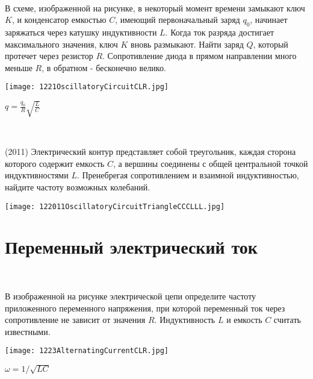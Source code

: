 \begin{ex}
\hspace{0pt} \\
\begin{minipage}{.65\textwidth}
В схеме, изображенной на рисунке, в некоторый момент времени замыкают ключ $K$, и конденсатор емкостью $C$, имеющий первоначальный заряд $q_0$, начинает заряжаться через катушку индуктивности $L$. 
Когда ток разряда достигает максимального значения, ключ $K$ вновь размыкают. Найти заряд $Q$, который протечет через резистор $R$. 
Сопротивление диода в прямом направлении много меньше $R$, в обратном - бесконечно велико.
\end{minipage}
\begin{minipage}{.35\textwidth}
\centering
\texttt{[image: 1221OscillatoryCircuitCLR.jpg]}
\end{minipage}
\begin{ans}
$q=\frac{q_0}{R}\sqrt{\frac{L}{C}}$
\end{ans}
\end{ex}

\begin{ex}
\hspace{0pt} \\
\begin{minipage}{.65\textwidth}
(2011) Электрический контур представляет собой треугольник, каждая сторона которого содержит емкость $C$, а вершины соединены с общей центральной точкой индуктивностями $L$. 
Пренебрегая сопротивлением и взаимной индуктивностью, найдите частоту возможных колебаний.
\end{minipage}
\begin{minipage}{.35\textwidth}
\centering
\texttt{[image: 122011OscillatoryCircuitTriangleCCCLLL.jpg]}
\end{minipage}
\begin{ans}
\end{ans}
\end{ex}

\section{Переменный электрический ток}

\begin{ex}
\hspace{0pt} \\
\begin{minipage}{.65\textwidth}
В изображенной на рисунке электрической цепи определите частоту приложенного переменного напряжения, при которой переменный ток через сопротивление не зависит от значения $R$. Индуктивность $L$ и емкость $C$ считать известными.
\end{minipage}
\begin{minipage}{.35\textwidth}
\centering
\texttt{[image: 1223AlternatingCurrentCLR.jpg]}
\end{minipage}
\begin{ans}
$\omega = 1/\sqrt{LC}$
\end{ans}
\end{ex}

